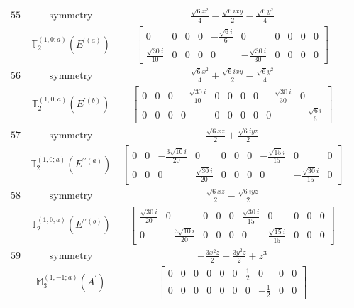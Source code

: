 \documentclass[fleqn,8pt,landscape]{jsarticle}
\begin{document}
\begin{longtable}{ccc}
$ 55 $ & $ \text{symmetry} $ & $ \frac{\sqrt{6} x^{2}}{4} - \frac{\sqrt{6} i x y}{2} - \frac{\sqrt{6} y^{2}}{4} $ \\
$  $ & $ \mathbb{T}_{2}^{(1,0;a)}(E^{\prime(a)}) $ & $ \begin{bmatrix} 0 & 0 & 0 & 0 & - \frac{\sqrt{6} i}{6} & 0 & 0 & 0 & 0 & 0 \\ \frac{\sqrt{30} i}{10} & 0 & 0 & 0 & 0 & - \frac{\sqrt{30} i}{30} & 0 & 0 & 0 & 0 \end{bmatrix} $ \\ \hline
$ 56 $ & $ \text{symmetry} $ & $ \frac{\sqrt{6} x^{2}}{4} + \frac{\sqrt{6} i x y}{2} - \frac{\sqrt{6} y^{2}}{4} $ \\
$  $ & $ \mathbb{T}_{2}^{(1,0;a)}(E^{\prime(b)}) $ & $ \begin{bmatrix} 0 & 0 & 0 & - \frac{\sqrt{30} i}{10} & 0 & 0 & 0 & 0 & - \frac{\sqrt{30} i}{30} & 0 \\ 0 & 0 & 0 & 0 & 0 & 0 & 0 & 0 & 0 & - \frac{\sqrt{6} i}{6} \end{bmatrix} $ \\ \hline
$ 57 $ & $ \text{symmetry} $ & $ \frac{\sqrt{6} x z}{2} + \frac{\sqrt{6} i y z}{2} $ \\
$  $ & $ \mathbb{T}_{2}^{(1,0;a)}(E^{\prime\prime(a)}) $ & $ \begin{bmatrix} 0 & 0 & - \frac{3 \sqrt{10} i}{20} & 0 & 0 & 0 & 0 & - \frac{\sqrt{15} i}{15} & 0 & 0 \\ 0 & 0 & 0 & \frac{\sqrt{30} i}{20} & 0 & 0 & 0 & 0 & - \frac{\sqrt{30} i}{15} & 0 \end{bmatrix} $ \\ \hline
$ 58 $ & $ \text{symmetry} $ & $ \frac{\sqrt{6} x z}{2} - \frac{\sqrt{6} i y z}{2} $ \\
$  $ & $ \mathbb{T}_{2}^{(1,0;a)}(E^{\prime\prime(b)}) $ & $ \begin{bmatrix} \frac{\sqrt{30} i}{20} & 0 & 0 & 0 & 0 & \frac{\sqrt{30} i}{15} & 0 & 0 & 0 & 0 \\ 0 & - \frac{3 \sqrt{10} i}{20} & 0 & 0 & 0 & 0 & \frac{\sqrt{15} i}{15} & 0 & 0 & 0 \end{bmatrix} $ \\ \hline
$ 59 $ & $ \text{symmetry} $ & $ - \frac{3 x^{2} z}{2} - \frac{3 y^{2} z}{2} + z^{3} $ \\
$  $ & $ \mathbb{M}_{3}^{(1,-1;a)}(A^{\prime}) $ & $ \begin{bmatrix} 0 & 0 & 0 & 0 & 0 & 0 & \frac{1}{2} & 0 & 0 & 0 \\ 0 & 0 & 0 & 0 & 0 & 0 & 0 & - \frac{1}{2} & 0 & 0 \end{bmatrix} $ \\ \hline

\end{longtable}
\end{document}
